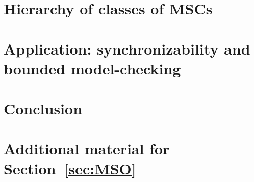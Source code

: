 \documentclass[acmsmall,review,anonymous,screen]{acmart}\settopmatter{printfolios=true,printccs=false,printacmref=true}
\begin{document}
\section{Hierarchy of classes of MSCs} \label{sec:hierarchy}



\section{Application: synchronizability and bounded model-checking}\label{sec:checking}



\section{Conclusion}\label{sec:conc}






\newpage


\newpage

\ifappendix

\appendix

\section{Additional material for Section~\ref{sec:MSO}}
\label{apx:MSO}

\end{document}
